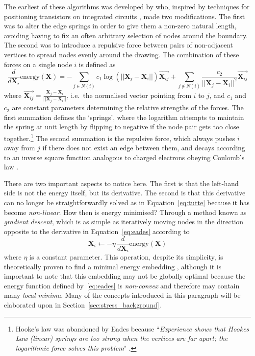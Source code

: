 The earliest of these algorithms was developed by \citet{Eades1984} who, inspired by techniques for positioning transistors on integrated circuits \citep{Quinn1979}, made two modifications. The first was to alter the edge springs in order to give them a non-zero natural length, avoiding having to fix an often arbitrary selection of nodes around the boundary. The second was to introduce a repulsive force between pairs of non-adjacent vertices to spread nodes evenly around the drawing.
The combination of these forces on a single node $i$ is defined as
\begin{equation}
  \frac{d}{d\mathbf{X}_i}\mathrm{energy}(\mathbf{X}) = -\sum_{j\in N(i)}c_1\log(||\mathbf{X}_j-\mathbf{X}_i||)\overrightarrow{\mathbf{X}_{ij}}
  + \sum_{j\notin N(i)}\frac{c_2}{||\mathbf{X}_j-\mathbf{X}_i||^2}\overrightarrow{\mathbf{X}_{ij}}
  \label{eq:eades}
\end{equation}
where $\overrightarrow{\mathbf{X}_{ij}} = \frac{\mathbf{X}_j-\mathbf{X}_i}{||\mathbf{X}_j-\mathbf{X}_i||}$, i.e.\ the normalised vector pointing from $i$ to $j$, and $c_1$ and $c_2$ are constant parameters determining the relative strengths of the forces. The first summation defines the `springs', where the logarithm attempts to maintain the spring at unit length by flipping to negative if the node pair gets too close together.\footnote{Hooke's law was abandoned by Eades because ``\emph{Experience shows that Hookes Law (linear) springs are too strong when the vertices are far apart; the logarithmic force solves this problem}" \citep{Eades1984}.}
The second summation is the repulsive force, which always pushes $i$ away from $j$ if there does not exist an edge between them, and decays according to an inverse square function analogous to charged electrons obeying Coulomb's law \citep{Coulomb1785}.

There are two important aspects to notice here. The first is that the left-hand side is not the energy itself, but its derivative. The second is that this derivative can no longer be straightforwardly solved as in Equation~\eqref{eq:tutte} because it has become \emph{non-linear}. How then is energy minimised? Through a method known as \emph{gradient descent}, which is as simple as iteratively moving nodes in the direction opposite to the derivative in Equation~\eqref{eq:eades} according to
\begin{equation}
  \mathbf{X}_i \leftarrow -\eta\, \frac{d}{d\mathbf{X}_i}\mathrm{energy}(\mathbf{X})
\label{eq:gradient_descent}
\end{equation}
where $\eta$ is a constant parameter.
This operation, despite its simplicity, is theoretically proven to find a minimal energy embedding \citep{Cauchy1847}, although it is important to note that this embedding may not be globally optimal because the energy function defined by~\eqref{eq:eades} is \emph{non-convex} and therefore may contain many \emph{local minima}. Many of the concepts introduced in this paragraph will be elaborated upon in Section~\ref{sec:stress_background}.

